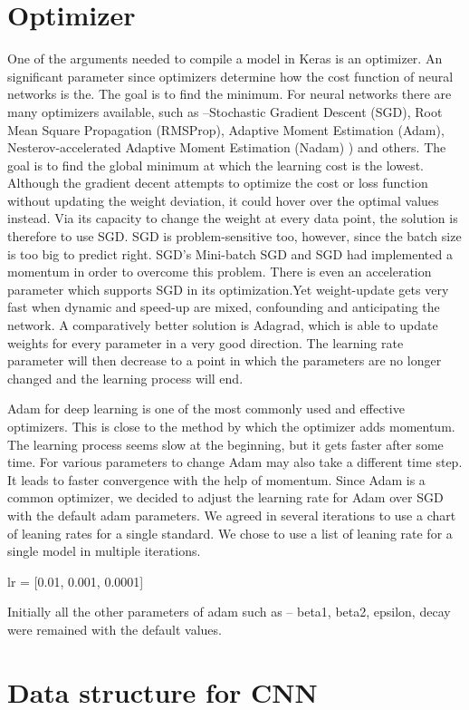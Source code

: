 \section{Optimizer}
One of the arguments needed to compile a model in Keras is an optimizer. An significant parameter since optimizers determine how the cost function of neural networks is the. The goal is to find the minimum. For neural networks there are many optimizers available, such as –Stochastic Gradient Descent (SGD), Root Mean Square Propagation (RMSProp), Adaptive Moment Estimation (Adam), Nesterov-accelerated Adaptive Moment Estimation (Nadam) ) and others. The goal is to find the global minimum at which the learning cost is the lowest.
Although the gradient decent attempts to optimize the cost or loss function without updating the weight deviation, it could hover over the optimal values instead. Via its capacity to change the weight at every data point, the solution is therefore to use SGD. SGD is problem-sensitive too, however, since the batch size is too big to predict right. SGD's Mini-batch SGD and SGD had implemented a momentum in order to overcome this problem. There is even an acceleration parameter which supports SGD in its optimization.Yet weight-update gets very fast when dynamic and speed-up are mixed, confounding and anticipating the network. A comparatively better solution is Adagrad, which is able to update weights for every parameter in a very good direction. The learning rate parameter will then decrease to a point in which the parameters are no longer changed and the learning process will end. 

Adam for deep learning is one of the most commonly used and effective optimizers. This is close to the method by which the optimizer adds momentum. The learning process seems slow at the beginning, but it gets faster after some time. For various parameters to change Adam may also take a different time step. It leads to faster convergence with the help of momentum. Since Adam is a common optimizer, we decided to adjust the learning rate for Adam over SGD with the default adam parameters. We agreed in several iterations to use a chart of leaning rates for a single standard.
We chose to use a list of leaning rate for a single model in multiple iterations.

lr = [0.01, 0.001, 0.0001]

Initially all the other parameters of adam such as – beta1, beta2, epsilon, decay were remained with the default values. 

\section{Data structure for CNN}


